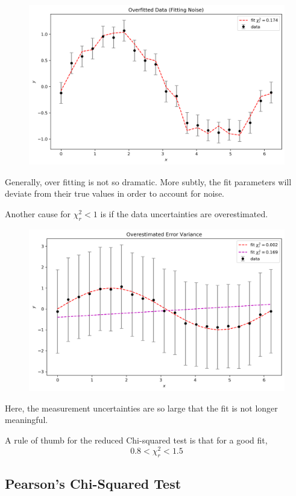 \documentclass[12pt]{article}
\numberwithin{equation}{section}
\theoremstyle{definition}
\begin{document}
\begin{figure}[H]
	\centering
	\includegraphics[width=12cm] {over}
\end{figure}

Generally, over fitting is not so dramatic. More subtly, the fit parameters will deviate from their true values in order to account for noise.

Another cause for $\chi^2_r<1$ is if the data uncertainties are overestimated.
\begin{figure}[H]
	\centering
	\includegraphics[width=12cm] {var}
\end{figure} 
Here, the measurement uncertainties are so large that the fit is not longer meaningful. 

A rule of thumb for the reduced Chi-squared test is that for a good fit,
\begin{equation}
		0.8 < \chi^2_r < 1.5
\end{equation}


\subsection{Pearson's Chi-Squared Test}
\end{document}
